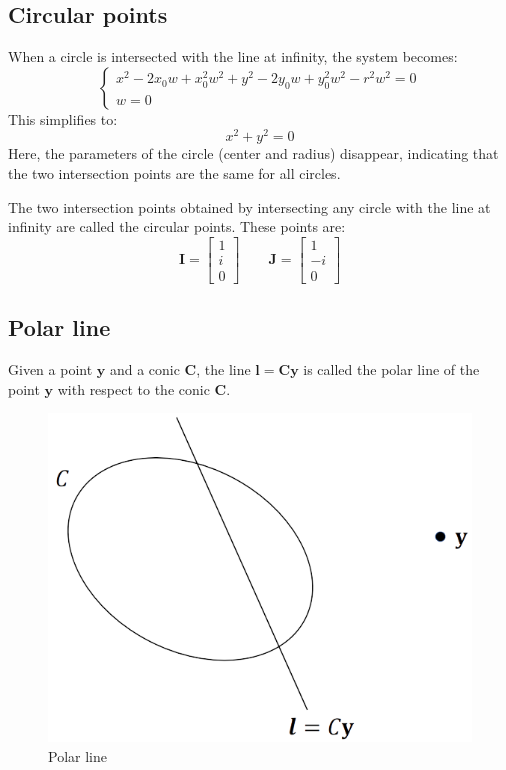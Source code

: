 \subsection{Circular points}
\begin{example}
    When a circle is intersected with the line at infinity, the system becomes:
    \[\begin{cases}
        x^2-2x_0w+x_0^2w^2+y^2-2y_0w+y_0^2w^2-r^2w^2=0 \\
        w=0
    \end{cases}\]
    This simplifies to:
    \[x^2+y^2=0\]
    Here, the parameters of the circle (center and radius) disappear, indicating that the two intersection points are the same for all circles.
\end{example}
\begin{definition}
    The two intersection points obtained by intersecting any circle with the line at infinity are called the circular points. 
    These points are:
    \[\mathbf{I}=\begin{bmatrix} 1 \\ i \\ 0 \end{bmatrix} \qquad \mathbf{J}=\begin{bmatrix} 1 \\ -i \\ 0 \end{bmatrix}\]
\end{definition}

\subsection{Polar line}
\begin{definition}
    Given a point $\mathbf{y}$ and a conic $\mathbf{C}$, the line $\mathbf{l}=\mathbf{Cy}$ is called the polar line of the point $\mathbf{y}$ with respect to the conic $\mathbf{C}$. 
\end{definition}
\begin{figure}[H]
    \centering
    \includegraphics[width=0.3\linewidth]{images/polar.png}
    \caption{Polar line}
\end{figure}

